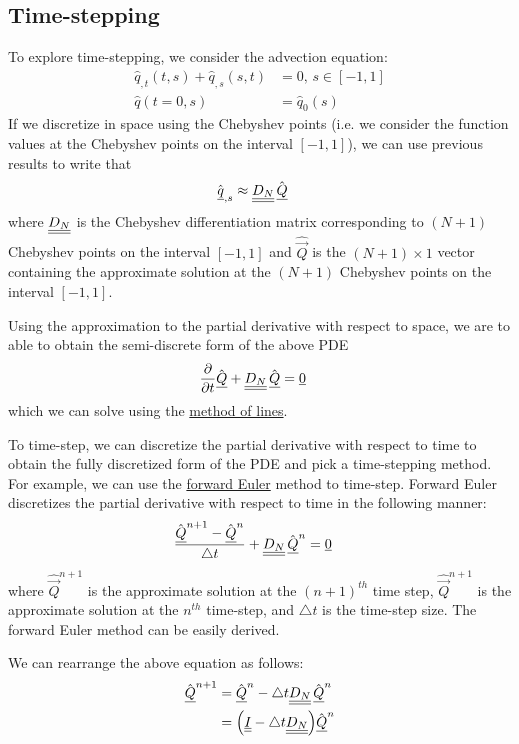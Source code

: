 
\subsection*{Time-stepping}
To explore time-stepping, we consider the advection equation:
\begin{align*}
	\hat{q}_{, t}(t, s) + \hat{q}_{, s}(s, t) & = 0, \, s \in [-1, 1] \\
	\hat{q}(t = 0, s) & = \hat{q}_{0}(s)
\end{align*}
If we discretize in space using the Chebyshev points (i.e. we consider the function values at the Chebyshev points on the interval $[-1, 1]$), we can use previous results to write that
\begin{align*}
	\hat{{\underline{q}}}_{, s} & \approx {\underline{\underline{D_{N}}}} \, \hat{{\underline{Q}}}
\end{align*}
where ${\underline{\underline{D_{N}}}}$ is the Chebyshev differentiation matrix corresponding to $(N + 1)$ Chebyshev points on the interval $[-1, 1]$ and $\hat{\vec{Q}}$ is the $(N+1) \times 1$ vector containing the approximate solution at the $(N + 1)$ Chebyshev points on the interval $[-1, 1]$.
\par 
Using the approximation to the partial derivative with respect to space, we are to able to obtain the semi-discrete form of the above PDE
\begin{align*}
	\frac{\partial}{\partial t} \hat{{\underline{Q}}} + {\underline{\underline{D_{N}}}} \, \hat{{\underline{Q}}} & = {\underline{0}}
\end{align*}
which we can solve using the \underline{method of lines}.
\par 
To time-step, we can discretize the partial derivative with respect to time to obtain the fully discretized form of the PDE and pick a time-stepping method.
For example, we can use the \underline{forward Euler} method to time-step.
Forward Euler discretizes the partial derivative with respect to time in the following manner:
\begin{align*}
	\frac{\hat{{\underline{Q}}}^{n+1} - \hat{{\underline{Q}}}^{n}}{\triangle t} + {\underline{\underline{D_{N}}}} \, \hat{{\underline{Q}}}^{n} & = {\underline{0}}
\end{align*}
where $\hat{\vec{Q}}^{n+1}$ is the approximate solution at the $(n+1)^{th}$ time step,  $\hat{\vec{Q}}^{n+1}$ is the approximate solution at the $n^{th}$ time-step, and $\triangle t$ is the time-step size. The forward Euler method can be easily derived.
\par 
We can rearrange the above equation as follows:
\begin{align*}
	\hat{{\underline{Q}}}^{n+1} & = \hat{{\underline{Q}}}^{n} - \triangle t {\underline{\underline{D_{N}}}} \, \hat{{\underline{Q}}}^{n} \\
						& = \Big( {\underline{\underline{I}}} - \triangle t  {\underline{\underline{D_{N}}}} \Big) \hat{{\underline{Q}}}^{n}
\end{align*}
